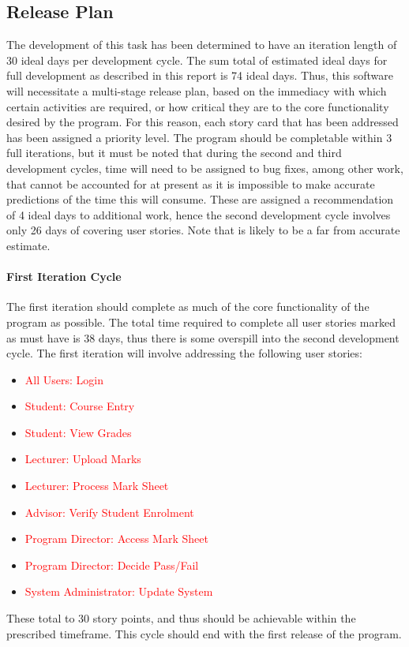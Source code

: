 \documentclass[11pt]{article}
\begin{document}
\subsection*{Release Plan}
The development of this task has been determined to have an iteration length of 30 ideal days per development cycle. The sum total of estimated ideal days for full development as described in this report is 74 ideal days. Thus, this software will necessitate a multi-stage release plan, based on the immediacy with which certain activities are required, or how critical they are to the core functionality desired by the program. For this reason, each story card that has been addressed has been assigned a priority level. The program should be completable within 3 full iterations, but it must be noted that during the second and third development cycles, time will need to be assigned to bug fixes, among other work, that cannot be accounted for at present as it is impossible to make accurate predictions of the time this will consume. These are assigned a recommendation of 4 ideal days to additional work, hence the second development cycle involves only 26 days of covering user stories. Note that is likely to be a far from accurate estimate.
\paragraph{First Iteration Cycle}
The first iteration should complete as much of the core functionality of the program as possible. The total time required to complete all user stories marked as must have is 38 days, thus there is some overspill into the second development cycle. The first iteration will involve addressing the following user stories:
\begin{itemize}
\item{\textcolor{red}{All Users: Login}}
\item{\textcolor{red}{Student: Course Entry}}
\item{\textcolor{red}{Student: View Grades}}
\item{\textcolor{red}{Lecturer: Upload Marks}}
\item{\textcolor{red}{Lecturer: Process Mark Sheet}}
\item{\textcolor{red}{Advisor: Verify Student Enrolment}}
\item{\textcolor{red}{Program Director: Access Mark Sheet}}
\item{\textcolor{red}{Program Director: Decide Pass/Fail}}
\item{\textcolor{red}{System Administrator: Update System}}
\end{itemize}
These total to 30 story points, and thus should be achievable within the prescribed timeframe. This cycle should end with the first release of the program.
\end{document}
